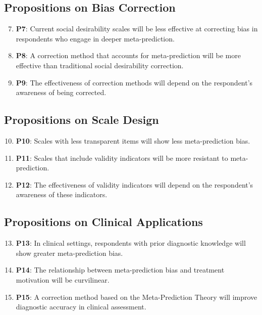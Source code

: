 \documentclass[10pt,twocolumn]{article}
\begin{document}
\subsection{Propositions on Bias Correction}

\begin{enumerate}
    \setcounter{enumi}{6}
    \item \textbf{P7}: Current social desirability scales will be less effective at correcting bias in respondents who engage in deeper meta-prediction.
    \item \textbf{P8}: A correction method that accounts for meta-prediction will be more effective than traditional social desirability correction.
    \item \textbf{P9}: The effectiveness of correction methods will depend on the respondent's awareness of being corrected.
\end{enumerate}

\subsection{Propositions on Scale Design}

\begin{enumerate}
    \setcounter{enumi}{9}
    \item \textbf{P10}: Scales with less transparent items will show less meta-prediction bias.
    \item \textbf{P11}: Scales that include validity indicators will be more resistant to meta-prediction.
    \item \textbf{P12}: The effectiveness of validity indicators will depend on the respondent's awareness of these indicators.
\end{enumerate}

\subsection{Propositions on Clinical Applications}

\begin{enumerate}
    \setcounter{enumi}{12}
    \item \textbf{P13}: In clinical settings, respondents with prior diagnostic knowledge will show greater meta-prediction bias.
    \item \textbf{P14}: The relationship between meta-prediction bias and treatment motivation will be curvilinear.
    \item \textbf{P15}: A correction method based on the Meta-Prediction Theory will improve diagnostic accuracy in clinical assessment.
\end{enumerate}
\end{document}
